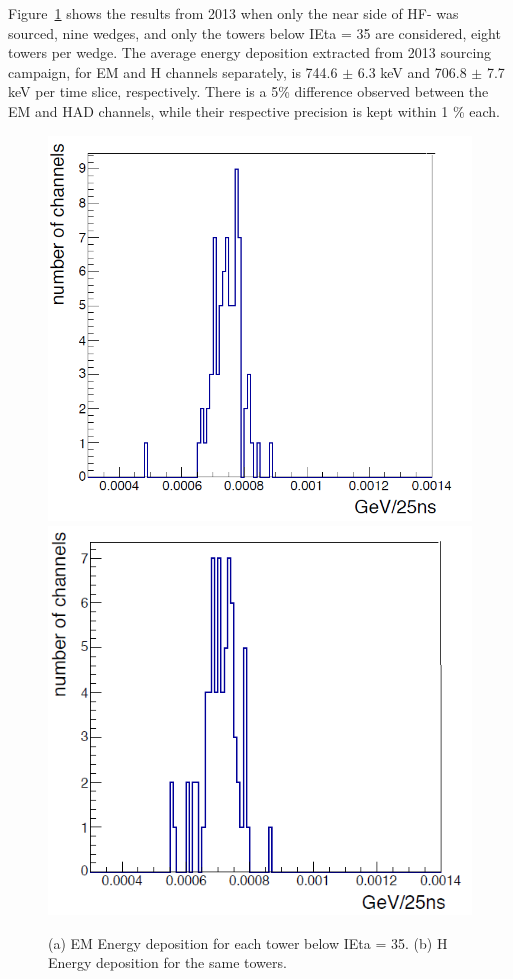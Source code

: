 Figure~\ref{fig:HFM_2013_Res} shows the results from 2013 when only the near side
of HF- was sourced, nine wedges, and only the towers below IEta = 35 are
considered, eight towers per wedge. The average energy deposition extracted from
2013 sourcing campaign, for EM and H channels separately, is 744.6 $\pm$ 6.3 keV and 706.8 $\pm$ 7.7 keV per time slice, respectively. There is a 5\% difference observed between the EM and HAD channels, while their
respective precision is kept within 1 \% each.
\begin{figure}[htb]
   \begin{center}
      \includegraphics[width=.45\textwidth]{figures/ch_hfcalibration/HFM_2013_Res_EM.png}
      \includegraphics[width=.45\textwidth]{figures/ch_hfcalibration/HFM_2013_Res_H.png}
      \caption{(a) EM Energy deposition for each tower below IEta = 35. (b) H Energy deposition for the same towers.}
      \label{fig:HFM_2013_Res}
   \end{center}
\end{figure}

